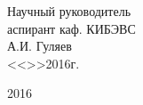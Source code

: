 \vfill

\begin{flushright}
\begin{minipage}{0.45\textwidth}
 \begin{flushleft}
  Научный руководитель \\
  аспирант каф. КИБЭВС \\
  \underline{\hspace{3cm}}А.И. Гуляев \\
  <<\underline{\hspace{1cm}}>>\underline{\hspace{3cm}}2016г.\\
 \end{flushleft}
\end{minipage}
\end{flushright}

\vfill

\begin{center}
 2016
\end{center}
